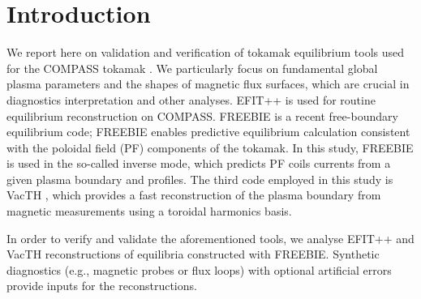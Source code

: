 
\section{Introduction} %
\label{sec:introduction}

We report here on validation and verification of tokamak equilibrium tools used for the COMPASS tokamak \cite{compass2006}. We particularly focus on fundamental global plasma parameters and the shapes of magnetic flux surfaces, which are crucial in diagnostics interpretation and other analyses. 
EFIT++ \cite{efitpp2006} is used for routine equilibrium reconstruction on COMPASS. FREEBIE \cite{freebie2012} is a recent free-boundary equilibrium code; FREEBIE enables predictive equilibrium calculation consistent with the poloidal field (PF) components of the tokamak. In this study, FREEBIE is used in the so-called inverse mode, which predicts PF coils currents from a given plasma boundary and profiles. The third code employed in this study is VacTH \cite{vacthref}, which provides a fast reconstruction of the plasma boundary from magnetic measurements using a toroidal harmonics basis.

In order to verify and validate the aforementioned tools, we analyse EFIT++ and VacTH reconstructions of equilibria constructed with FREEBIE. Synthetic diagnostics (e.g., magnetic probes or flux loops) with optional artificial errors provide inputs for the reconstructions. 

